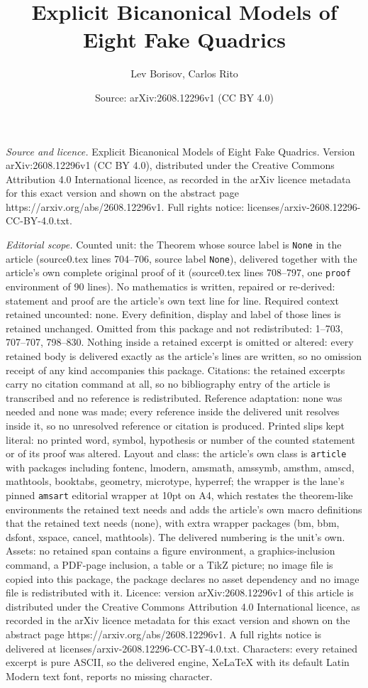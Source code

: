 \documentclass[10pt,a4paper]{amsart}
\title[Explicit Bicanonical Models of Eight Fake Quadrics]{Explicit Bicanonical Models of Eight Fake Quadrics}
\author{Lev Borisov, Carlos Rito}
\date{Source: arXiv:2608.12296v1 (CC BY 4.0)}
\begin{document}
\maketitle

\noindent\emph{Source and licence.} Explicit Bicanonical Models of Eight Fake Quadrics. Version arXiv:2608.12296v1 (CC BY 4.0), distributed under the Creative Commons Attribution 4.0 International licence, as recorded in the arXiv licence metadata for this exact version and shown on the abstract page https://arxiv.org/abs/2608.12296v1. Full rights notice: licenses/arxiv-2608.12296-CC-BY-4.0.txt.\par\smallskip

\noindent\textit{Editorial scope.} Counted unit: the Theorem whose source label is \texttt{None} in the article (source0.tex lines 704--706, source label \texttt{None}), delivered together with the article's own complete original proof of it (source0.tex lines 708--797, one \texttt{proof} environment of 90 lines). No mathematics is written, repaired or re-derived: statement and proof are the article's own text line for line. Required context retained uncounted: none. Every definition, display and label of those lines is retained unchanged. Omitted from this package and not redistributed: 1--703, 707--707, 798--830. Nothing inside a retained excerpt is omitted or altered: every retained body is delivered exactly as the article's lines are written, so no omission receipt of any kind accompanies this package. Citations: the retained excerpts carry no citation command at all, so no bibliography entry of the article is transcribed and no reference is redistributed. Reference adaptation: none was needed and none was made; every reference inside the delivered unit resolves inside it, so no unresolved reference or citation is produced. Printed slips kept literal: no printed word, symbol, hypothesis or number of the counted statement or of its proof was altered. Layout and class: the article's own class is \texttt{article} with packages including fontenc, lmodern, amsmath, amssymb, amsthm, amscd, mathtools, booktabs, geometry, microtype, hyperref; the wrapper is the lane's pinned \texttt{amsart} editorial wrapper at 10pt on A4, which restates the theorem-like environments the retained text needs and adds the article's own macro definitions that the retained text needs (none), with extra wrapper packages (bm, bbm, dsfont, xspace, cancel, mathtools). The delivered numbering is the unit's own. Assets: no retained span contains a figure environment, a graphics-inclusion command, a PDF-page inclusion, a table or a TikZ picture; no image file is copied into this package, the package declares no asset dependency and no image file is redistributed with it. Licence: version arXiv:2608.12296v1 of this article is distributed under the Creative Commons Attribution 4.0 International licence, as recorded in the arXiv licence metadata for this exact version and shown on the abstract page https://arxiv.org/abs/2608.12296v1. A full rights notice is delivered at licenses/arxiv-2608.12296-CC-BY-4.0.txt. Characters: every retained excerpt is pure ASCII, so the delivered engine, XeLaTeX with its default Latin Modern text font, reports no missing character.
\end{document}
